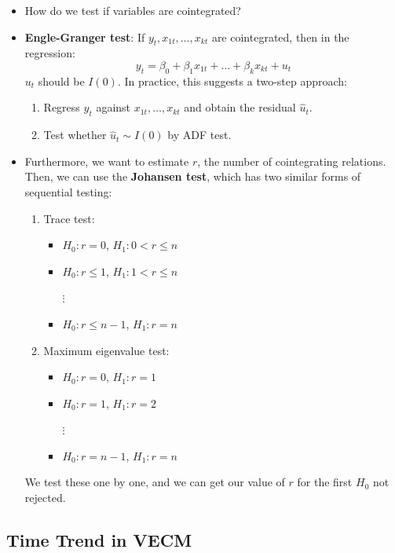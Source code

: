 \documentclass[notitlepage]{article}
\begin{document}
\begin{itemize}
    \item How do we test if variables are cointegrated?
    \item \textbf{Engle-Granger test}: If \(y_t, x_{1t}, \dots, x_{kt}\) are cointegrated, then in the regression:
    \[
    y_t = \beta_0 + \beta_1 x_{1t} + \dots + \beta_k x_{kt} + u_t
    \]
    \(u_t\) should be \(I(0)\). In practice, this suggests a two-step approach:
    \begin{enumerate}
        \item Regress \(y_t\) against \(x_{1t}, \dots, x_{kt}\) and obtain the residual \(\hat{u}_t\).
        \item Test whether \(\hat{u}_t \sim I(0)\) by ADF test.
    \end{enumerate}
    \item Furthermore, we want to estimate \(r\), the number of cointegrating relations. Then, we can use the \textbf{Johansen test}, which has two similar forms of sequential testing:
    \begin{enumerate}
        \item Trace test:
        \begin{itemize}
            \item \(H_0: r=0\), \(H_1: 0 < r \le n\)
            \item \(H_0: r\le1\), \(H_1: 1 < r \le n\)

            \(\vdots\)

            \item \(H_0: r\le n-1\), \(H_1: r = n\)
        \end{itemize}
        \item Maximum eigenvalue test:
        \begin{itemize}
            \item \(H_0: r=0\), \(H_1: r=1\)
            \item \(H_0: r=1\), \(H_1: r=2\)

            \(\vdots\)

            \item \(H_0: r= n-1\), \(H_1: r=n\)
        \end{itemize}
    \end{enumerate}
    We test these one by one, and we can get our value of \(r\) for the first \(H_0\) not rejected.
\end{itemize}

\subsection{Time Trend in VECM}
\end{document}
